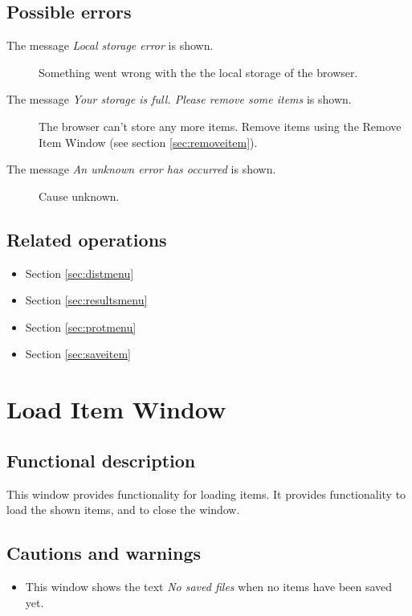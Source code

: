   \subsection*{Possible errors}
  \begin{description}
  \item[The message \emph{Local storage error} is shown.] Something went wrong with the the local storage of the browser.
  \item[The message \emph{Your storage is full. Please remove some items} is shown.] The browser can't store any more items. Remove items using the Remove Item Window (see section \ref{sec:removeitem}).
  \item[The message \emph{An unknown error has occurred} is shown.] Cause unknown.
  \end{description}

  \subsection*{Related operations}
   \begin{itemize}
   \item Section \ref{sec:distmenu}
   \item Section \ref{sec:resultsmenu}
   \item Section \ref{sec:protmenu}
   \item Section \ref{sec:saveitem}
  \end{itemize}

\section{Load Item Window}
\label{sec:loaditemwindow}
  \subsection*{Functional description}
  This window provides functionality for loading items. It provides functionality to load the shown items, and to close the window.

  \subsection*{Cautions and warnings}
  \begin{itemize}
  \item This window shows the text \emph{No saved files} when no items have been saved yet.
  \end{itemize}


